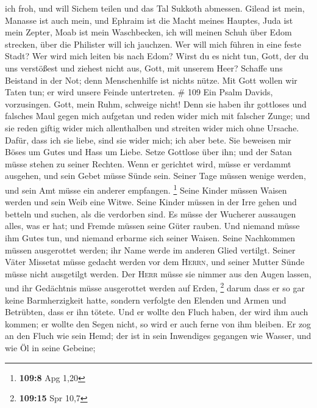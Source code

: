 ich froh, und will Sichem teilen und das Tal Sukkoth abmessen.
 Gilead ist mein, Manasse ist auch mein, und Ephraim ist
die Macht meines Hauptes, Juda ist mein Zepter,  Moab ist
mein Waschbecken, ich will meinen Schuh über Edom strecken, über die
Philister will ich jauchzen.  Wer will mich führen in
eine feste Stadt? Wer wird mich leiten bis nach Edom? 
Wirst du es nicht tun, Gott, der du uns verstößest und ziehest nicht
aus, Gott, mit unserem Heer?  Schaffe uns Beistand in der
Not; denn Menschenhilfe ist nichts nütze.  Mit Gott
wollen wir Taten tun; er wird unsere Feinde untertreten. \# 109
 Ein Psalm Davids, vorzusingen. Gott, mein Ruhm, schweige
nicht!  Denn sie haben ihr gottloses und falsches Maul
gegen mich aufgetan und reden wider mich mit falscher Zunge;
 und sie reden giftig wider mich allenthalben und streiten
wider mich ohne Ursache.  Dafür, dass ich sie liebe, sind
sie wider mich; ich aber bete.  Sie beweisen mir Böses um
Gutes und Hass um Liebe.  Setze Gottlose über ihn; und der
Satan müsse stehen zu seiner Rechten.  Wenn er gerichtet
wird, müsse er verdammt ausgehen, und sein Gebet müsse Sünde sein.
 Seiner Tage müssen wenige werden, und sein Amt müsse ein
anderer empfangen. \footnote{\textbf{109:8} Apg 1,20} 
Seine Kinder müssen Waisen werden und sein Weib eine Witwe.
 Seine Kinder müssen in der Irre gehen und betteln und
suchen, als die verdorben sind.  Es müsse der Wucherer
aussaugen alles, was er hat; und Fremde müssen seine Güter rauben.
 Und niemand müsse ihm Gutes tun, und niemand erbarme
sich seiner Waisen.  Seine Nachkommen müssen ausgerottet
werden; ihr Name werde im anderen Glied vertilgt.  Seiner
Väter Missetat müsse gedacht werden vor dem \textsc{Herrn}, und seiner
Mutter Sünde müsse nicht ausgetilgt werden.  Der
\textsc{Herr} müsse sie nimmer aus den Augen lassen, und ihr Gedächtnis
müsse ausgerottet werden auf Erden, \footnote{\textbf{109:15} Spr 10,7}
 darum dass er so gar keine Barmherzigkeit hatte, sondern
verfolgte den Elenden und Armen und Betrübten, dass er ihn tötete.
 Und er wollte den Fluch haben, der wird ihm auch kommen;
er wollte den Segen nicht, so wird er auch ferne von ihm bleiben.
 Er zog an den Fluch wie sein Hemd; der ist in sein
Inwendiges gegangen wie Wasser, und wie Öl in seine Gebeine;
